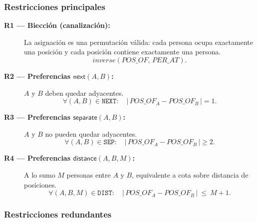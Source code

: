 \subsubsection*{Restricciones principales}

\begin{description}
  \item[\textbf{R1 — Biección (canalización):}] La asignación es una permutación válida: cada persona ocupa exactamente una posición y cada posición contiene exactamente una persona.
  \[
    \textit{inverse}(POS\_OF,\,PER\_AT).
  \]

  \item[\textbf{R2 — Preferencias \(\textsf{next}(A,B)\):}] \(A\) y \(B\) deben quedar adyacentes.
  \[
    \forall (A,B)\in \texttt{NEXT}:\quad \big|\,POS\_OF_A - POS\_OF_B\,\big| = 1.
  \]

  \item[\textbf{R3 — Preferencias \(\textsf{separate}(A,B)\):}] \(A\) y \(B\) no pueden quedar adyacentes.
  \[
    \forall (A,B)\in \texttt{SEP}:\quad \big|\,POS\_OF_A - POS\_OF_B\,\big| \ge 2.
  \]

  \item[\textbf{R4 — Preferencias \(\textsf{distance}(A,B,M)\):}] A lo sumo \(M\) personas entre \(A\) y \(B\), equivalente a cota sobre distancia de posiciones.
  \[
    \forall (A,B,M)\in \texttt{DIST}:\quad \big|\,POS\_OF_A - POS\_OF_B\,\big|\ \le\ M+1.
  \]
\end{description}

\subsubsection*{Restricciones redundantes}

